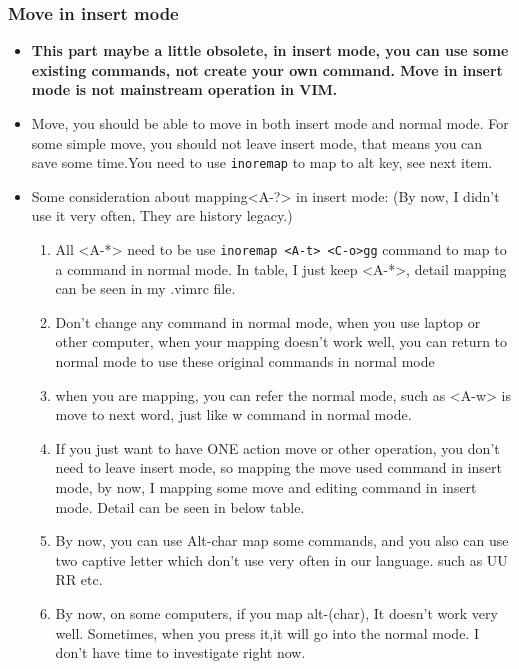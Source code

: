 \documentclass[a4paper,11pt,twoside]{book}
\begin{document}
\subsubsection{Move in insert mode}
\begin{itemize}
		\item \textbf{This part maybe a little obsolete, in insert mode, you can use some existing commands, not create your own command. Move in insert mode is not mainstream operation in VIM.}

		\item Move, you should be able to move in both insert mode and normal mode. For some simple move, you should not leave insert mode, that means you can save some time.You need to use \verb!inoremap! to map to alt key, see next item.  

		\item Some consideration about mapping<A-?> in insert mode: (By now, I didn't use it very often, They are history legacy.)
			\begin{enumerate}
					\item All <A-*> need to be use \verb!inoremap <A-t> <C-o>gg! command to map to a command in normal mode. In table, I just keep <A-*>, detail mapping can be seen in my .vimrc file. 

					\item Don't change any command in normal mode, when you use laptop or other computer, when your mapping doesn't work well, you can return to normal mode to use these original commands in normal mode

					\item when you are mapping, you can refer the normal mode, such as <A-w> is move to next word, just like w command in normal mode.

					\item If you just want to have ONE action move or other operation, you don't need to leave insert mode, so mapping the move used command in insert mode, by now, I mapping some move and editing command in insert mode. Detail can be seen in below table.

					\item By now, you can use Alt-char map some commands, and you also can use two captive letter which don't use very often in our language. such as UU RR etc. 

					\item By now, on some computers, if you map alt-(char), It doesn't work very well. Sometimes, when you press it,it will go into the normal mode. I don't have time to investigate right now. 
			\end{enumerate}
\end{itemize}
\end{document}
